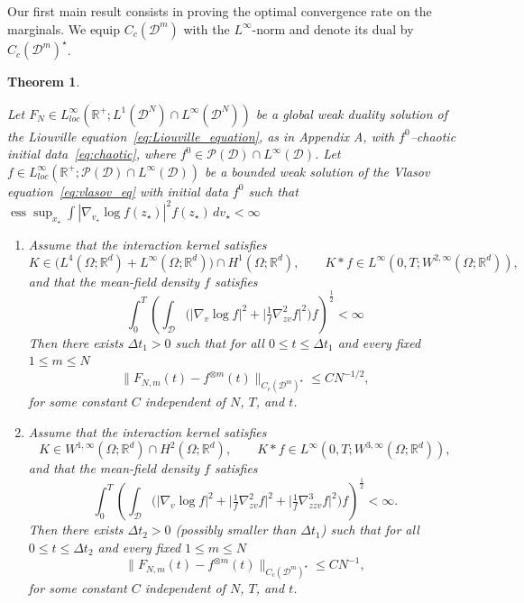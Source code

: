 \documentclass[pdflatex,sn-mathphys-num]{sn-jnl}
\theoremstyle{thmstyleone}%
\newtheorem{theorem}{Theorem}
\theoremstyle{thmstyletwo}%
\theoremstyle{thmstylethree}%
\begin{document}
Our first main result consists in proving the optimal convergence rate on the marginals. We equip \(C_c(\mathcal D^m)\) with the \(L^\infty\)-norm and denote its dual by
\(C_c(\mathcal D^m)^\star\).
\begin{theorem}\label{thm1}

Let $F_N \in L^{\infty}_{loc}(\mathbb{R}^+; L^1(\mathcal D^N)\cap L^\infty(\mathcal D^N))$ be a global weak duality solution of the Liouville equation~\eqref{eq:Liouville_equation}, as in Appendix A, with $f^0$--chaotic initial data~\eqref{eq:chaotic}, where $f^0 \in \mathcal P(\mathcal D)\cap L^\infty(\mathcal D)$. Let $f \in L^{\infty}_{loc}(\mathbb{R}^+; \mathcal P(\mathcal D)\cap L^\infty(\mathcal D))$ be a bounded weak solution of the Vlasov equation~\eqref{eq:vlasov_eq} with initial data $f^0$ such that $\operatorname{ess}\sup_{x_\star} \int |\nabla_{v_\star}\log f(z_\star)|^2 f(z_\star)\,dv_\star < \infty$

\begin{enumerate}

\item Assume that the interaction kernel satisfies 
\[
K \in \big( L^4(\Omega;\mathbb R^d) + L^\infty(\Omega;\mathbb R^d) \big)\cap H^1(\Omega;\mathbb R^d),
\qquad
K*f \in L^\infty(0,T; W^{2,\infty}(\Omega ; \mathbb{R}^d)),
\]
and that the mean-field density $f$ satisfies
\[
\int_0^T \left( \int_{\mathcal D} \Big( |\nabla_v \log f|^2 + \Big|\tfrac{1}{f}\nabla^2_{zv} f\Big|^2 \Big) f \right)^{\frac12} < \infty
\]
Then there exists $\Delta t_1>0$ such that for all $0 \le t \le \Delta t_1$ and every fixed $1 \leq m \leq N$
\[
\|F_{N,m}(t) - f^{\otimes m}(t)\|_{C_c(\mathcal D^m)^\star}
\le C N^{-1/2},
\]
for some constant $C$ independent of $N$, $T$, and $t$.\\

\item Assume that the interaction kernel satisfies
\[
K \in W^{1,\infty}(\Omega;\mathbb R^d)\cap H^2(\Omega;\mathbb R^d),
\qquad
K*f \in L^\infty(0,T; W^{3,\infty}(\Omega ; \mathbb{R}^d)),
\]
and that the mean-field density $f$ satisfies
\[
\int_0^T \left( \int_{\mathcal D} \Big( |\nabla_v \log f|^2 
+ \Big|\tfrac{1}{f}\nabla^2_{zv} f\Big|^2 
+ \Big|\tfrac{1}{f}\nabla^3_{zzv} f\Big|^2 \Big) f \right)^{\frac12} < \infty.
\]
Then there exists $\Delta t_2>0$ (possibly smaller than $\Delta t_1$) such that for all $0 \le t \le \Delta t_2$ and every fixed $1 \leq m \leq N$
\[
\|F_{N,m}(t) - f^{\otimes m}(t)\|_{C_c(\mathcal D^m)^\star}
\le C N^{-1},
\]
for some constant $C$ independent of $N$, $T$, and $t$. \\

\end{enumerate}

\end{theorem}
%
\end{document}
